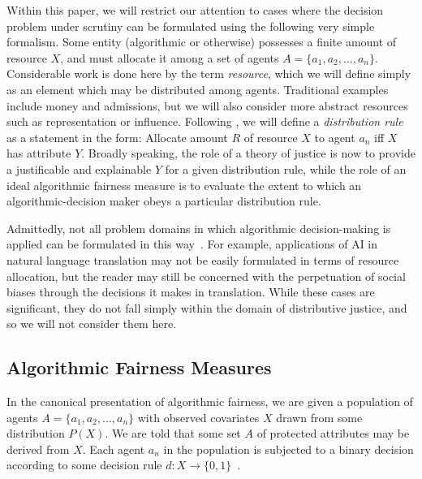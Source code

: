 Within this paper, we will restrict our attention to cases where the decision
problem under scrutiny can be formulated using the following very simple
formalism. Some entity (algorithmic or otherwise) possesses a finite amount of
resource $X$, and must allocate it among a set of agents
$A = \{a_1, a_2, \ldots, a_n\}$. Considerable work is done here by the term 
\textit{resource}, which we will define simply as an element which may be 
distributed among agents. Traditional examples include money and admissions,
but we will also consider more abstract resources such as representation or
influence. Following \cite{Kuppler_2021}, we will define a \textit{distribution
rule} as a statement in the form: Allocate amount $R$ of resource $X$ to agent
$a_n$ iff $X$ has attribute $Y$. Broadly speaking, the role of a theory of
justice is now to provide a justificable and explainable $Y$ for a given
distribution rule, while the role of an ideal algorithmic fairness measure is to
evaluate the extent to which an algorithmic-decision maker obeys a particular
distribution rule.

Admittedly, not all problem domains in which algorithmic decision-making is
applied can be formulated in this way~\cite{Green_2017}. For example,
applications of AI in natural language translation may not be easily formulated
in terms of resource allocation, but the reader may still be concerned with the
perpetuation of social biases through the decisions it makes in translation.
While these cases are significant, they do not fall simply within the domain of
distributive justice, and so we will not consider them here.

\subsection{Algorithmic Fairness Measures}\label{sec:fairness-measures}
In the canonical presentation of algorithmic fairness, we are given a population
of agents $A = \{a_1, a_2, \ldots, a_n\}$ with observed covariates $X$ drawn
from some distribution $P(X)$. We are told that some set $A$ of protected 
attributes may be derived from $X$. Each agent $a_n$ in the population is
subjected to a binary decision according to some decision rule
$d: X \to \{0, 1\}$~\cite{CorbettDavies_2023}.


